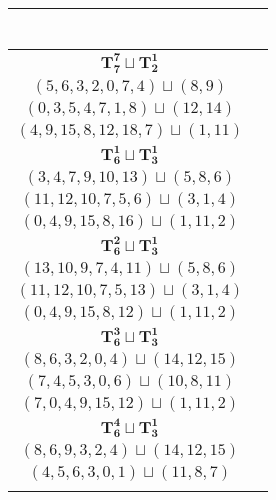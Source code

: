 \documentclass{article}
\begin{document}
\begin{longtable}{|c|c|}
\begin{tabular}{c}
        \end{tabular} \\ 
        \hline
        $\mathbf{T_{7}^{7}} \sqcup \mathbf{T_{2}^{1}}$ & \begin{tabular}{c}
        $(2,4,6,9,12,1,8)\sqcup(14,15)$ \\ 
        $(5,6,3,2,0,7,4)\sqcup(8,9)$ \\ 
        $(0,3,5,4,7,1,8)\sqcup(12,14)$ \\ 
        $(4,9,15,8,12,18,7)\sqcup(1,11)$
        \end{tabular} \\ 
        \hline
        $\mathbf{T_{6}^{1}} \sqcup \mathbf{T_{3}^{1}}$ & \begin{tabular}{c}
        $(1,2,4,6,9,12)\sqcup(13,14,15)$ \\ 
        $(3,4,7,9,10,13)\sqcup(5,8,6)$ \\ 
        $(11,12,10,7,5,6)\sqcup(3,1,4)$ \\ 
        $(0,4,9,15,8,16)\sqcup(1,11,2)$
        \end{tabular} \\ 
        \hline
        $\mathbf{T_{6}^{2}} \sqcup \mathbf{T_{3}^{1}}$ & \begin{tabular}{c}
        $(1,2,4,6,9,5)\sqcup(13,14,15)$ \\ 
        $(13,10,9,7,4,11)\sqcup(5,8,6)$ \\ 
        $(11,12,10,7,5,13)\sqcup(3,1,4)$ \\ 
        $(0,4,9,15,8,12)\sqcup(1,11,2)$
        \end{tabular} \\ 
        \hline
        $\mathbf{T_{6}^{3}} \sqcup \mathbf{T_{3}^{1}}$ & \begin{tabular}{c}
        $(0,1,2,4,6,5)\sqcup(16,13,14)$ \\ 
        $(8,6,3,2,0,4)\sqcup(14,12,15)$ \\ 
        $(7,4,5,3,0,6)\sqcup(10,8,11)$ \\ 
        $(7,0,4,9,15,12)\sqcup(1,11,2)$
        \end{tabular} \\ 
        \hline
        $\mathbf{T_{6}^{4}} \sqcup \mathbf{T_{3}^{1}}$ & \begin{tabular}{c}
        $(1,2,5,4,6,7)\sqcup(16,14,13)$ \\ 
        $(8,6,9,3,2,4)\sqcup(14,12,15)$ \\ 
        $(4,5,6,3,0,1)\sqcup(11,8,7)$ \\ 

\end{tabular}
\end{longtable}
\end{document}
